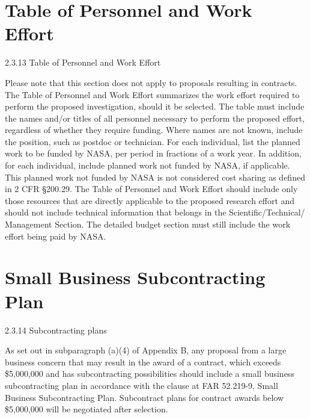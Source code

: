 \documentclass[12pt]{article}
\begin{document}
\cleardoublepage

\section*{Table of Personnel and Work Effort}
2.3.13 Table of Personnel and Work Effort

Please note that this section does not apply to proposals resulting in
contracts. The Table of Personnel and Work Effort summarizes the work
effort required to perform the proposed investigation, should it be
selected. The table must include the names and/or titles of all
personnel necessary to perform the proposed effort, regardless of
whether they require funding. Where names are not known, include the
position, such as postdoc or technician. For each individual, list the
planned work to be funded by NASA, per period in fractions of a work
year. In addition, for each individual, include planned work not
funded by NASA, if applicable. This planned work not funded by NASA is
not considered cost sharing as defined in 2 CFR \S 200.29. The Table of
Personnel and Work Effort should include only those resources that are
directly applicable to the proposed research effort and should not
include technical information that belongs in the
Scientific/Technical/ Management Section. The detailed budget section
must still include the work effort being paid by NASA.



\cleardoublepage

\section*{Small Business Subcontracting Plan}
2.3.14 Subcontracting plans

As set out in subparagraph (a)(4) of Appendix B, any proposal from a
large business concern that may result in the award of a contract,
which exceeds \$5,000,000 and has subcontracting possibilities should
include a small business subcontracting plan in accordance with the
clause at FAR 52.219-9, Small Business Subcontracting
Plan. Subcontract plans for contract awards below \$5,000,000 will be
negotiated after selection.
\end{document}
